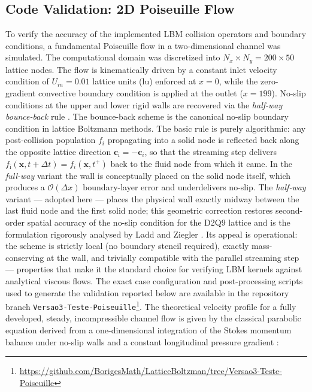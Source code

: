 \subsection{Code Validation: 2D Poiseuille Flow}
To verify the accuracy of the implemented LBM collision operators and boundary conditions, a fundamental Poiseuille flow in a two-dimensional channel was simulated.
The computational domain was discretized into $N_x \times N_y = 200 \times 50$ lattice nodes.
The flow is kinematically driven by a constant inlet velocity condition of $U_{in} = 0.01$ lattice units (lu) enforced at $x=0$, while the zero-gradient convective boundary condition is applied at the outlet ($x=199$).
No-slip conditions at the upper and lower rigid walls are recovered via the \emph{half-way bounce-back} rule \cite{ladd1994numerical, ziegler1993boundary}.
The bounce-back scheme is the canonical no-slip boundary condition in lattice Boltzmann methods.
The basic rule is purely algorithmic: any post-collision population $f_i$ propagating into a solid node is reflected back along the opposite lattice direction $\bm{c}_{\bar{\imath}} = -\bm{c}_i$, so that the streaming step delivers $f_{\bar{\imath}}(\bm{x},t+\Delta t) = f_i(\bm{x},t^{+})$ back to the fluid node from which it came.
In the \emph{full-way} variant the wall is conceptually placed on the solid node itself, which produces a $\mathcal{O}(\Delta x)$ boundary-layer error and underdelivers no-slip.
The \emph{half-way} variant --- adopted here --- places the physical wall exactly midway between the last fluid node and the first solid node;
this geometric correction restores second-order spatial accuracy of the no-slip condition for the D2Q9 lattice and is the formulation rigorously analysed by Ladd \cite{ladd1994numerical} and Ziegler \cite{ziegler1993boundary}.
Its appeal is operational: the scheme is strictly local (no boundary stencil required), exactly mass-conserving at the wall, and trivially compatible with the parallel streaming step --- properties that make it the standard choice for verifying LBM kernels against analytical viscous flows.
The exact case configuration and post-processing scripts used to generate the validation reported below are available in the repository branch \texttt{Versao3-Teste-Poiseuille}\footnote{\url{https://github.com/BorigesMath/LatticeBoltzman/tree/Versao3-Teste-Poiseuille}}.
The theoretical velocity profile for a fully developed, steady, incompressible channel flow is given by the classical parabolic equation derived from a one-dimensional integration of the Stokes momentum balance under no-slip walls and a constant longitudinal pressure gradient \cite{white2006viscous}:
